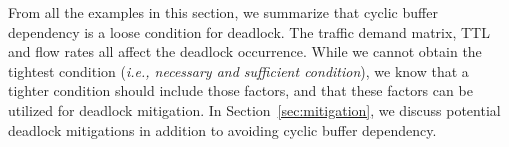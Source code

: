 
 From all the examples in this section, we summarize that cyclic buffer dependency is
 a loose condition for deadlock. The traffic demand matrix, TTL and flow rates all affect the deadlock
 occurrence. While we cannot obtain the tightest condition ({\em i.e., necessary and sufficient condition}), 
we know that a tighter condition should include those factors, and that these factors can be utilized
for deadlock mitigation. In Section~\ref{sec:mitigation}, we discuss potential deadlock mitigations in 
addition to avoiding cyclic buffer dependency.

%
%
%
%
